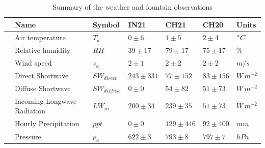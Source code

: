 \documentclass[utf8]{frontiersSCNS} %
\begin{document}
\begin{table}
	\centering
	\caption{ Summary of the weather and fountain observations}
	\label{tab:Observations}
	\begin{tabular}{@{}|lllllll|@{}}
		\toprule
		\textbf{}              & \textbf{Name}               & \textbf{Symbol}     & \textbf{IN21} &
		\textbf{CH21}          & \textbf{CH20}               & \textbf{Units}                                                                 \\ \midrule
		\multicolumn{1}{|l|}{\multirow{9}{*}{\rotatebox[origin=c]{90}{Weather}}}
		                       & Air temperature             & $T_a    $           & $0 \pm 6$     & $1 \pm 5$    & $2
		\pm 4$                 & $\degree C$                                                                                                  \\
		\multicolumn{1}{|l|}{} & Relative humidity           & $RH     $           & $39 \pm 17$   & $79 \pm 17$  & $75
		\pm 17$                & \%                                                                                                           \\
		\multicolumn{1}{|l|}{} & Wind speed                  & $v_a        $       & $2 \pm 1$     & $2 \pm 2$    &
		$2 \pm 2$              & $m/s$                                                                                                        \\
		\multicolumn{1}{|l|}{} & Direct Shortwave            & $SW_{direct} $      & $243 \pm 331$ & $77 \pm 152$
		                       & $83 \pm 156$                & $W\,m^{-2}$                                                                    \\
		\multicolumn{1}{|l|}{} & Diffuse Shortwave           & $SW_{diffuse}$      & $0 \pm 0$     & $54 \pm 82$  & $51 \pm 73$ & $W\,m^{-2}$ \\
		\multicolumn{1}{|l|}{} & Incoming Longwave Radiation & $LW_{in}$           & $200 \pm 34$  & $239 \pm 35$ & $51 \pm 73$ & $W\,m^{-2}$ \\
		\multicolumn{1}{|l|}{} & Hourly Precipitation        & $ppt        $       & $0 \pm 0$     & $129 \pm
		446$                   & $92 \pm 400$                & $mm$                                                                           \\
		\multicolumn{1}{|l|}{} & Pressure                    & $p_a         $      & $622 \pm 3$   & $793 \pm 8$  &
		$797 \pm7$             & $hPa$                                                                                                        \\\bottomrule

\end{tabular}
\end{table}
\end{document}

